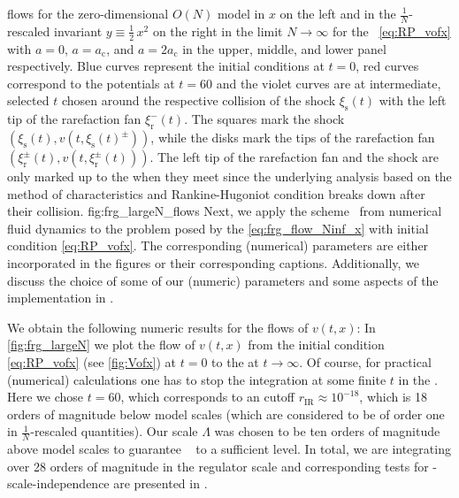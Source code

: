 	{%
		\frg{} flows for the zero-dimensional $O(N)$ model in $x$ on the left  and in the $\tfrac{1}{N}$-rescaled invariant $y \equiv \tfrac{1}{2} \, x^2$ on the right  in the limit $N \rightarrow \infty$ for the \ic{}~\eqref{eq:RP_vofx} with ${a = 0}$, ${a = a_\mathrm{c}}$, and ${a = 2 a_\mathrm{c}}$ in the upper, middle, and lower panel respectively.
		{Blue} curves represent the \uv{} initial conditions at $t=0$, {red} curves correspond to the \ir{} potentials at $t = 60$ and the {violet} curves are at intermediate, selected \rgtimes{} $t$ chosen around the respective collision of the shock $\xi_\mathrm{s} ( t ) $ with the left tip of the rarefaction fan $\xi_\mathrm{r}^{-}(t)$.
		The squares mark the shock $( \xi_\mathrm{s} ( t ), v ( t, \xi_\mathrm{s} ( t )^\pm ) )$, while the disks mark the tips of the rarefaction fan $( \xi_\mathrm{r}^\pm ( t ), v ( t, \xi_\mathrm{r}^\pm ( t ) ) )$.
		The left tip of the rarefaction fan and the shock are only marked up to the \rgtime{} when they meet since the underlying analysis based on the method of characteristics and Rankine-Hugoniot condition breaks down after their collision.
	}%
	{fig:frg_largeN_flows}%
Next, we apply the \kt{} scheme~\cite{KTO2-0} from numerical fluid dynamics to the problem posed by the \pde{} \eqref{eq:frg_flow_Ninf_x} with initial condition \eqref{eq:RP_vofx}.
The corresponding (numerical) parameters are either incorporated in the figures or their corresponding captions.
Additionally, we discuss the choice of some of our (numeric) parameters and some aspects of the implementation in \LargeNnumApp{}.

We obtain the following numeric results for the \frg{} flows of $v ( t, x )$: In \cref{fig:frg_largeN} we plot the \frg{} flow of $v ( t, x )$ from the \uv{} initial condition \eqref{eq:RP_vofx} (see \cref{fig:Vofx}) at $t = 0$ to the \ir{} at $t \rightarrow \infty$. 
Of course, for practical (numerical) calculations one has to stop the integration at some finite $t$ in the \ir{}.
Here we chose $t = 60$, which corresponds to an \ir{} cutoff $r_\mathrm{IR} \approx 10^{-18}$, which is 18 orders of magnitude below model scales (which are considered to be of order one in $\tfrac{1}{N}$-rescaled quantities).
Our \uv{} scale $\Lambda$ was chosen to be ten orders of magnitude above model scales to guarantee \rgcy{}~\cite{Braun:2018svj,Koenigstein:2021syz} to a sufficient level. 
In total, we are integrating over 28 orders of magnitude in the regulator scale and corresponding tests for \uv{}-scale-independence are presented in \LargeNnumApp{}.

